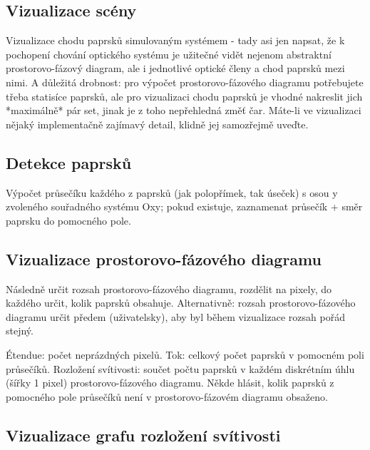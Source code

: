 
\subsection{Vizualizace scény}


Vizualizace chodu paprsků simulovaným systémem - tady asi jen napsat, že
k pochopení chování optického systému je užitečné vidět nejenom
abstraktní prostorovo-fázový diagram, ale i jednotlivé optické členy a
chod paprsků mezi nimi. A důležitá drobnost: pro výpočet
prostorovo-fázového diagramu potřebujete třeba statisíce paprsků, ale
pro vizualizaci chodu paprsků je vhodné nakreslit jich *maximálně* pár
set, jinak je z toho nepřehledná změť čar. Máte-li ve vizualizaci nějaký
implementačně zajímavý detail, klidně jej samozřejmě uveďte.

\subsection{Detekce paprsků}


Výpočet průsečíku každého z
paprsků (jak polopřímek, tak úseček) s osou y zvoleného souřadného
systému Oxy; pokud existuje, zaznamenat průsečík + směr paprsku do
pomocného pole.


\subsection{Vizualizace prostorovo-fázového diagramu}


Následně určit rozsah prostorovo-fázového diagramu,
rozdělit na pixely, do každého určit, kolik paprsků obsahuje.
Alternativně: rozsah prostorovo-fázového diagramu určit předem
(uživatelsky), aby byl během vizualizace rozsah pořád stejný.

Étendue: počet neprázdných pixelů. Tok: celkový počet paprsků v pomocném
poli průsečíků. Rozložení svítivosti: součet počtu paprsků v každém
diskrétním úhlu (šířky 1 pixel) prostorovo-fázového diagramu. Někde
hlásit, kolik paprsků z pomocného pole průsečíků není v
prostorovo-fázovém diagramu obsaženo.

\subsection{Vizualizace grafu rozložení svítivosti}

\todo{}

